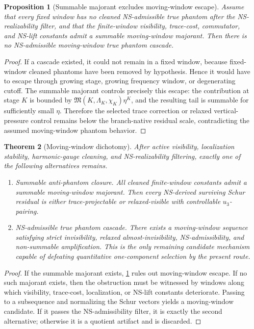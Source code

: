 \documentclass[11pt]{article}
\numberwithin{equation}{section}
\newtheorem{theorem}{Theorem}[section]
\newtheorem{proposition}[theorem]{Proposition}
\begin{document}
\begin{proposition}[Summable majorant excludes moving-window escape]\label{prop:summable-majorant-excludes-moving-window}
Assume that every fixed window has no cleaned NS-admissible true phantom after the NS-realizability filter, and that the finite-window visibility, trace-cost, commutator, and NS-lift constants admit a summable moving-window majorant.  Then there is no NS-admissible moving-window true phantom cascade.
\end{proposition}

\begin{proof}
If a cascade existed, it could not remain in a fixed window, because fixed-window cleaned phantoms have been removed by hypothesis.  Hence it would have to escape through growing stage, growing frequency window, or degenerating cutoff.  The summable majorant controls precisely this escape: the contribution at stage \(K\) is bounded by \(\mathfrak M(K,\Lambda_K,\chi_K)\eta^K\), and the resulting tail is summable for sufficiently small \(\eta\).  Therefore the selected trace correction or relaxed vertical-pressure control remains below the branch-native residual scale, contradicting the assumed moving-window phantom behavior.
\end{proof}

\begin{theorem}[Moving-window dichotomy]\label{thm:moving-window-dichotomy}
After active visibility, localization stability, harmonic-gauge cleaning, and NS-realizability filtering, exactly one of the following alternatives remains.
\begin{enumerate}
\item \emph{Summable anti-phantom closure.}  All cleaned finite-window constants admit a summable moving-window majorant.  Then every NS-derived surviving Schur residual is either trace-projectable or relaxed-visible with controllable \(u_3\)-pairing.
\item \emph{NS-admissible true phantom cascade.}  There exists a moving-window sequence satisfying strict invisibility, relaxed almost-invisibility, NS-admissibility, and non-summable amplification.  This is the only remaining candidate mechanism capable of defeating quantitative one-component selection by the present route.
\end{enumerate}
\end{theorem}

\begin{proof}
If the summable majorant exists, \cref{prop:summable-majorant-excludes-moving-window} rules out moving-window escape.  If no such majorant exists, then the obstruction must be witnessed by windows along which visibility, trace-cost, localization, or NS-lift constants deteriorate.  Passing to a subsequence and normalizing the Schur vectors yields a moving-window candidate.  If it passes the NS-admissibility filter, it is exactly the second alternative; otherwise it is a quotient artifact and is discarded.
\end{proof}
\end{document}
